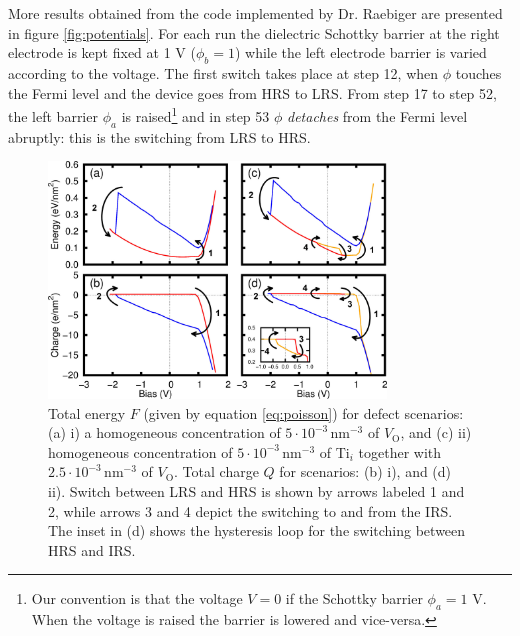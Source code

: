More results obtained from the code implemented by Dr. Raebiger are presented in figure \ref{fig:potentials}. For each run the dielectric Schottky barrier at the right electrode is kept fixed at 1 V ($\phi_b = 1$) while the left electrode barrier is varied according to the voltage. The first switch takes place at step 12, when $\phi$ touches the Fermi level and the device goes from HRS to LRS. From step 17 to step 52, the left barrier $\phi_a$ is raised\footnote{Our convention is that the voltage $V = 0$ if the Schottky barrier $\phi_a = 1$ V. When the voltage is raised the barrier is lowered and vice-versa.} and in step 53 $\phi$ \textit{detaches} from the Fermi level abruptly: this is the switching from LRS to HRS.
\begin{center}
  \begin{figure}[h!]
    \begin{center}
      \includegraphics[width=0.8\textwidth]{img/charge-energy.jpg}    
      \caption{Total energy $F$ (given by equation \ref{eq:poisson}) for defect scenarios: (a) i) a homogeneous concentration of $5 \cdot 10^{-3} \, \text{nm}^{-3}$ of $V_{\text{O}}$, and (c) ii) homogeneous concentration of $5 \cdot 10^{-3} \, \text{nm}^{-3}$ of Ti$_i$ together with $2.5 \cdot 10^{-3} \, \text{nm}^{-3}$ of $V_{\text{O}}$. Total charge $Q$ for scenarios: (b) i), and (d) ii). Switch between LRS and HRS is shown by arrows labeled 1 and 2, while arrows 3 and 4 depict the switching to and from the IRS. The inset in (d) shows the hysteresis loop for the switching between HRS and IRS.} 
      \label{fig:charge-energy} 
    \end{center}
  \end{figure}
\end{center}

